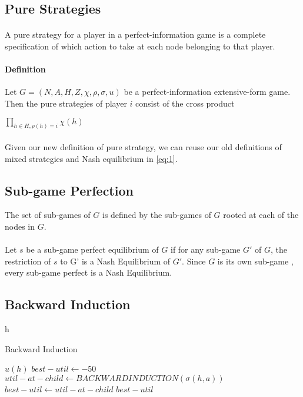 \subsection{Pure Strategies}
\paragraph{} A pure strategy for a player in a perfect-information game is a complete specification of which action to take at each node belonging to that player.
\paragraph{Definition} Let $G = (N, A, H, Z,\chi ,\rho, \sigma, u ) $ be a perfect-information extensive-form game. Then the pure strategies of player $i$ consist of the cross product\\
\begin{center}
$ \prod_{h \in H, \rho(h)=i}\chi(h)$
\end{center}
\paragraph{}
Given our new definition of pure strategy, we can reuse our old definitions of mixed strategies and Nash equilibrium in \ref{eq:1}.

\subsection{Sub-game Perfection}
\begin{mydef}\label{def:def555}
The set of sub-games of $G$ is defined by the sub-games of $G$ rooted at each of the nodes in $G$.
\end{mydef}
\paragraph{}Let $s$ be a  sub-game perfect equilibrium of $G$ if for any sub-game $G'$ of $G$, the restriction of $s$ to G' is a Nash Equilibrium of $G'$. Since $G$ is its own sub-game , every sub-game perfect is a Nash Equilibrium.

\subsection{Backward Induction}

\begin{algorithm}{h}
\caption{Backward Induction\label{fig:scaled_back}}
\begin{algorithmic}
\RETURN $u(h)$
\ENDIF
\STATE $best-util \leftarrow -50$
\STATE $util-at-child \leftarrow BACKWARDINDUCTION(\sigma(h,a))$ 
\STATE $best-util \leftarrow util-at-child$
\ENDIF
\ENDFOR
\RETURN $best-util$
\end{algorithmic}
\end{algorithm}
